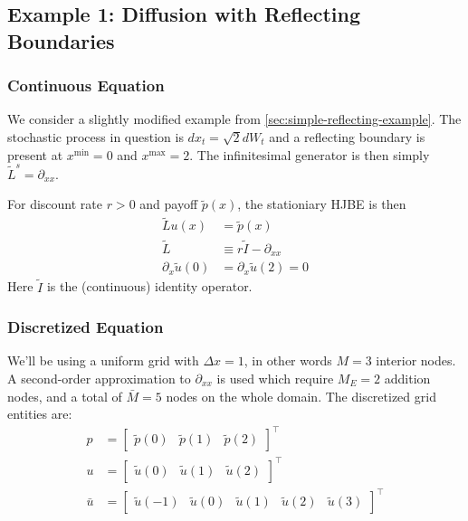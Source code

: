 \documentclass[11pt]{article}
\newcommand{\D}[1][]{\ensuremath{\partial_{#1}}}
\begin{document}
\subsection{Example 1: Diffusion with Reflecting Boundaries}\label{sec:appendixA-example1}
\subsubsection{Continuous Equation}
We consider a slightly modified example from \cref{sec:simple-reflecting-example}. The stochastic process in question is $dx_t = \sqrt{2}dW_t$ and a reflecting boundary is present at $x^{\min} = 0$ and $x^{\max} = 2$. The infinitesimal generator is then simply $\tilde{L}^s = \D[xx]$.

For discount rate $r > 0$ and payoff $\tilde{p}(x)$, the stationiary HJBE is then
\begin{align}
	\tilde{L}u(x) &= \tilde{p}(x)\\
	\tilde{L} &\equiv r\tilde{I} - \D[xx] \\
	\D[x]\tilde{u}(0) &= \D[x]\tilde{u}(2) = 0
\end{align}
Here $\tilde{I}$ is the (continuous) identity operator.

\subsubsection{Discretized Equation}
We'll be using a uniform grid with $\Delta x = 1$, in other words $M = 3$ interior nodes. A second-order approximation to $\D[xx]$ is used which require $M_E = 2$ addition nodes, and a total of $\bar{M} = 5$ nodes on the whole domain. The discretized grid entities are:
\begin{align}
	p &= \begin{bmatrix} \tilde{p}(0) & \tilde{p}(1) & \tilde{p}(2)\end{bmatrix}^{\top}\\
	u &= \begin{bmatrix} \tilde{u}(0) & \tilde{u}(1) & \tilde{u}(2)\end{bmatrix}^{\top}\\
	\bar{u} &= \begin{bmatrix} \tilde{u}(-1)  & \tilde{u}(0) & \tilde{u}(1) & \tilde{u}(2) &  \tilde{u}(3)\end{bmatrix}^{\top}
\end{align}
\end{document}
